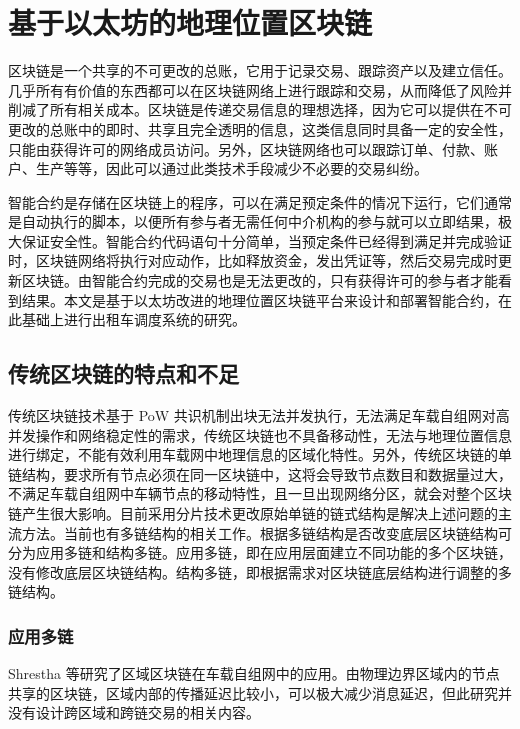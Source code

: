 \section{基于以太坊的地理位置区块链}
区块链是一个共享的不可更改的总账，它用于记录交易、跟踪资产以及建立信任。几乎所有有价值的东西都可以在区块链网络上进行跟踪和交易，从而降低了风险并削减了所有相关成本。区块链是传递交易信息的理想选择，因为它可以提供在不可更改的总账中的即时、共享且完全透明的信息，这类信息同时具备一定的安全性，只能由获得许可的网络成员访问。另外，区块链网络也可以跟踪订单、付款、账户、生产等等，因此可以通过此类技术手段减少不必要的交易纠纷。

智能合约是存储在区块链上的程序，可以在满足预定条件的情况下运行，它们通常是自动执行的脚本，以便所有参与者无需任何中介机构的参与就可以立即结果，极大保证安全性。智能合约代码语句十分简单，当预定条件已经得到满足并完成验证时，区块链网络将执行对应动作，比如释放资金，发出凭证等，然后交易完成时更新区块链。由智能合约完成的交易也是无法更改的，只有获得许可的参与者才能看到结果。本文是基于以太坊改进的地理位置区块链平台来设计和部署智能合约，在此基础上进行出租车调度系统的研究。

\subsection{传统区块链的特点和不足}
传统区块链技术基于 PoW 共识机制出块无法并发执行，无法满足车载自组网对高并发操作和网络稳定性的需求，传统区块链也不具备移动性，无法与地理位置信息进行绑定，不能有效利用车载网中地理信息的区域化特性。另外，传统区块链的单链结构，要求所有节点必须在同一区块链中，这将会导致节点数目和数据量过大，不满足车载自组网中车辆节点的移动特性，且一旦出现网络分区，就会对整个区块链产生很大影响。目前采用分片技术更改原始单链的链式结构是解决上述问题的主流方法。当前也有多链结构的相关工作。根据多链结构是否改变底层区块链结构可分为应用多链和结构多链。应用多链，即在应用层面建立不同功能的多个区块链，没有修改底层区块链结构。结构多链，即根据需求对区块链底层结构进行调整的多链结构。
\subsubsection{应用多链}
Shrestha 等研究了区域区块链在车载自组网中的应用。由物理边界区域内的节点共享的区块链，区域内部的传播延迟比较小，可以极大减少消息延迟，但此研究并没有设计跨区域和跨链交易的相关内容。

